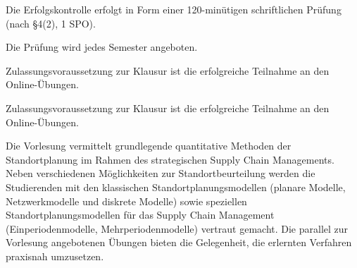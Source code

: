 \begin{course}

\setdoclanguagegerman
{}



\coursehead


\label{cour_7813.dp_997}


\begin{styleenv}
\begin{assessment}
Die Erfolgskontrolle erfolgt in Form einer 120-minütigen schriftlichen Prüfung (nach §4(2), 1 SPO).

 

Die Prüfung wird jedes Semester angeboten.

 

Zulassungsvoraussetzung zur Klausur ist die erfolgreiche Teilnahme an den Online-Übungen.


\end{assessment}

\begin{conditions}Zulassungsvoraussetzung zur Klausur ist die erfolgreiche Teilnahme an den Online-Übungen.

\end{conditions}


\end{styleenv}

\begin{learningoutcomes}
Die Vorlesung vermittelt grundlegende quantitative Methoden der Standortplanung im Rahmen des strategischen Supply Chain Managements. Neben verschiedenen Möglichkeiten zur Standortbeurteilung werden die Studierenden mit den klassischen Standortplanungsmodellen (planare Modelle, Netzwerkmodelle und diskrete Modelle) sowie speziellen Standortplanungsmodellen für das Supply Chain Management (Einperiodenmodelle, Mehrperiodenmodelle) vertraut gemacht. Die parallel zur Vorlesung angebotenen Übungen bieten die Gelegenheit, die erlernten Verfahren praxisnah umzusetzen.



\end{learningoutcomes}
\end{course}
